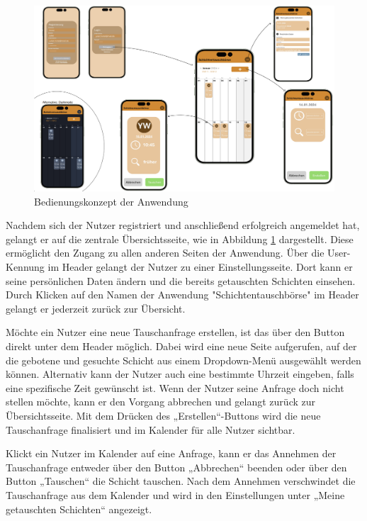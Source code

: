 \begin{figure}[h]
    \centering
    \includegraphics[clip,width=0.9\linewidth]{images/Bedienungskonzept_V1.png}
    \caption[Bedienungskonzept der Anwendung]{Bedienungskonzept der Anwendung}
    \label{Bedienungskonzept_V1}
\end{figure}

Nachdem sich der Nutzer registriert und anschließend erfolgreich angemeldet hat, gelangt er auf die zentrale Übersichtsseite, wie in Abbildung \ref{Bedienungskonzept_V1} dargestellt. 
Diese ermöglicht den Zugang zu allen anderen Seiten der Anwendung. 
Über die User-Kennung im Header gelangt der Nutzer zu einer Einstellungsseite. 
Dort kann er seine persönlichen Daten ändern und die bereits getauschten Schichten einsehen. 
Durch Klicken auf den Namen der Anwendung "Schichtentauschbörse" im Header gelangt er jederzeit zurück zur Übersicht.

Möchte ein Nutzer eine neue Tauschanfrage erstellen, ist das über den Button direkt unter dem Header möglich. 
Dabei wird eine neue Seite aufgerufen, auf der die gebotene und gesuchte Schicht aus einem Dropdown-Menü ausgewählt werden können. 
Alternativ kann der Nutzer auch eine bestimmte Uhrzeit eingeben, falls eine spezifische Zeit gewünscht ist. 
Wenn der Nutzer seine Anfrage doch nicht stellen möchte, kann er den Vorgang abbrechen und gelangt zurück zur Übersichtsseite. 
Mit dem Drücken des „Erstellen“-Buttons wird die neue Tauschanfrage finalisiert und im Kalender für alle Nutzer sichtbar.

Klickt ein Nutzer im Kalender auf eine Anfrage, kann er das Annehmen der Tauschanfrage entweder über den Button „Abbrechen“ beenden oder über den Button „Tauschen“ die Schicht tauschen. 
Nach dem Annehmen verschwindet die Tauschanfrage aus dem Kalender und wird in den Einstellungen unter „Meine getauschten Schichten“ angezeigt.

